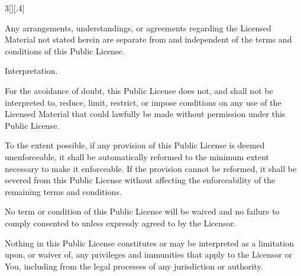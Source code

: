 \documentclass[8pt,a4paper]{article}
\begin{document}
\begin{multicols}{3}[][.4\paperwidth]
\begin{longenum}
\begin{longenum}
  \item Any arrangements, understandings, or agreements regarding the
     Licensed Material not stated herein are separate from and
     independent of the terms and conditions of this Public License.

  \end{longenum}

 \item Interpretation.

  \begin{longenum}

  \item For the avoidance of doubt, this Public License does not, and
     shall not be interpreted to, reduce, limit, restrict, or impose
     conditions on any use of the Licensed Material that could lawfully
     be made without permission under this Public License.

  \item To the extent possible, if any provision of this Public License is
     deemed unenforceable, it shall be automatically reformed to the
     minimum extent necessary to make it enforceable. If the provision
     cannot be reformed, it shall be severed from this Public License
     without affecting the enforceability of the remaining terms and
     conditions.

  \item No term or condition of this Public License will be waived and no
     failure to comply consented to unless expressly agreed to by the
     Licensor.

  \item Nothing in this Public License constitutes or may be interpreted
     as a limitation upon, or waiver of, any privileges and immunities
     that apply to the Licensor or You, including from the legal
     processes of any jurisdiction or authority.

  \end{longenum}

\end{longenum}


\medskip


\end{multicols}
\end{document}
